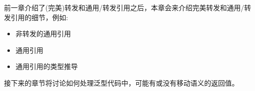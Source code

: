 前一章介绍了(完美)转发和通用/转发引用之后，本章会来介绍完美转发和通用/转发引用的细节，例如:

\begin{itemize}
	\item 非转发的通用引用
	\item 通用引用
	\item 通用引用的类型推导
\end{itemize}

接下来的章节将讨论如何处理泛型代码中，可能有或没有移动语义的返回值。
















